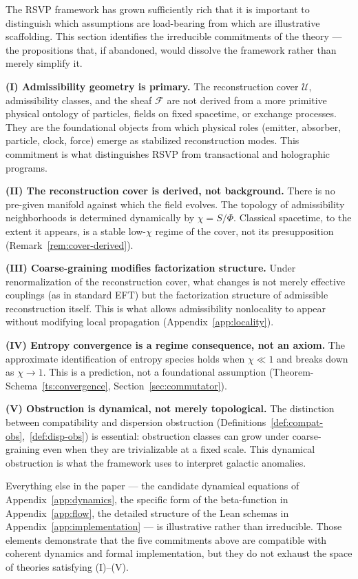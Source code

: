 \documentclass[11pt, a4paper]{article}
\theoremstyle{plain}
\theoremstyle{definition}
\theoremstyle{remark}
\newcommand{\sheaf}{\mathcal{F}}
\newcommand{\Ucover}{\mathcal{U}}
\begin{document}
The RSVP framework has grown sufficiently rich that it is important to distinguish
which assumptions are load-bearing from which are illustrative scaffolding. This
section identifies the irreducible commitments of the theory --- the propositions
that, if abandoned, would dissolve the framework rather than merely simplify it.

\medskip
\noindent\textbf{(I) Admissibility geometry is primary.}
The reconstruction cover $\Ucover$, admissibility classes, and the sheaf $\sheaf$
are not derived from a more primitive physical ontology of particles, fields on fixed
spacetime, or exchange processes. They are the foundational objects from which
physical roles (emitter, absorber, particle, clock, force) emerge as stabilized
reconstruction modes. This commitment is what distinguishes RSVP from transactional
and holographic programs.

\medskip
\noindent\textbf{(II) The reconstruction cover is derived, not background.}
There is no pre-given manifold against which the field evolves. The topology of
admissibility neighborhoods is determined dynamically by $\chi = S/\Phi$. Classical
spacetime, to the extent it appears, is a stable low-$\chi$ regime of the cover, not
its presupposition (Remark~\ref{rem:cover-derived}).

\medskip
\noindent\textbf{(III) Coarse-graining modifies factorization structure.}
Under renormalization of the reconstruction cover, what changes is not merely
effective couplings (as in standard EFT) but the factorization structure of admissible
reconstruction itself. This is what allows admissibility nonlocality to appear without
modifying local propagation (Appendix~\ref{app:locality}).

\medskip
\noindent\textbf{(IV) Entropy convergence is a regime consequence, not an axiom.}
The approximate identification of entropy species holds when $\chi \ll 1$ and breaks
down as $\chi \to 1$. This is a prediction, not a foundational assumption
(Theorem-Schema~\ref{ts:convergence}, Section~\ref{sec:commutator}).

\medskip
\noindent\textbf{(V) Obstruction is dynamical, not merely topological.}
The distinction between compatibility and dispersion obstruction
(Definitions~\ref{def:compat-obs},~\ref{def:disp-obs}) is essential: obstruction
classes can grow under coarse-graining even when they are trivializable at a fixed
scale. This dynamical obstruction is what the framework uses to interpret galactic
anomalies.

\medskip
Everything else in the paper --- the candidate dynamical equations of
Appendix~\ref{app:dynamics}, the specific form of the beta-function in
Appendix~\ref{app:flow}, the detailed structure of the Lean schemas in
Appendix~\ref{app:implementation} --- is illustrative rather than irreducible. Those
elements demonstrate that the five commitments above are compatible with coherent
dynamics and formal implementation, but they do not exhaust the space of theories
satisfying (I)--(V).
\end{document}
